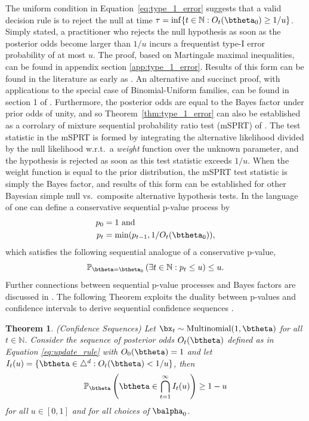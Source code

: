 \documentclass[11pt]{article}
\newtheorem{thm}{Theorem}[section]
\begin{document}
The uniform condition in Equation~\ref{eq:type_1_error} suggests that a valid decision rule is to reject the null at time $\tau = \inf \lbrace t \in \mathbb{N}: O_t(\btheta_0) \geq 1/u \rbrace$.
Simply stated, a practitioner who rejects the null hypothesis as soon as the posterior odds become larger than $1/u$ incurs a frequentist type-I error probability of at most $u$.
The proof, based on Martingale maximal inequalities, can be found in appendix section \ref{app:type_1_error}.
Results of this form can be found in the literature as early as \cite{ville}.
An alternative and succinct proof, with applications to the special case of Binomial-Uniform families, can be found in section 1 of \cite{robbins}.
Furthermore, the posterior odds are equal to the Bayes factor under prior odds of unity, and so Theorem~\ref{thm:type_1_error} can also be established as a corrolary of mixture sequential probability ratio test (mSPRT) of \cite{wald}.
The test statistic in the mSPRT is formed by integrating the alternative likelihood divided by the null likelihood w.r.t.\ a \textit{weight} function over the unknown parameter, and the hypothesis is rejected as soon as this test statistic exceeds $1/u$.
When the weight function is equal to the prior distribution, the mSPRT test statistic is simply the Bayes factor, and results of this form can be established for other Bayesian simple null vs.\ composite alternative hypothesis tests.
In the language of \cite{johari} one can define a conservative sequential p-value process by
\begin{align*}
  p_0 &=1 \text{ and}\\
  p_t &= \min(p_{t-1}, 1/O_t(\btheta_0)),
\end{align*}
which satisfies the following sequential analogue of a conservative p-value,
\begin{equation}
  \label{eq:conservative_p_value}
  \mathbb{P}_{\btheta = \btheta_0}\left( \exists t \in \mathbb{N}: p_t \leq u \right) \leq u.
\end{equation}
Further connections between sequential p-value processes and Bayes factors are discussed in \cite{shafer}.
The following Theorem exploits the duality between p-values and confidence intervals to derive sequential confidence sequences .
\begin{thm}(Confidence Sequences)
  \label{thm:confidence_sequence}
  \noindent Let $\bx_t\sim \mathrm{Multinomial}(1,\btheta)$ for all $t \in \mathbb{N}$.
Consider the sequence of posterior odds $O_t(\btheta)$ defined as in Equation \eqref{eq:update_rule} with $O_0(\btheta)=1$ and
 let $I_t(u) = \lbrace \btheta \in \triangle^d : O_t(\btheta) < 1/u  \rbrace$, then
\begin{equation}
  \label{eq:confidence_sequence}
  \mathbb{P}_{\btheta}\left( \btheta \in \bigcap_{t=1}^{\infty} I_t(u) \right) \geq 1- u
\end{equation}
for all $u \in [0,1]$ and for all choices of $\balpha_0$.
\end{thm}
\end{document}
